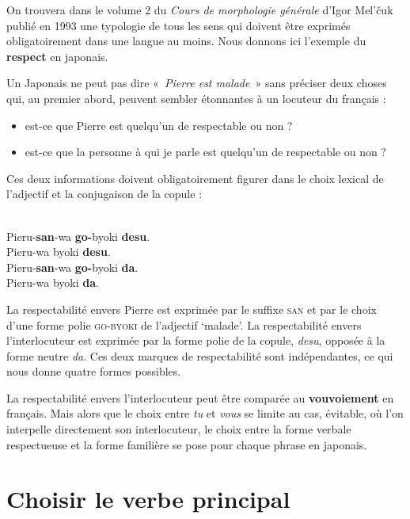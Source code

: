 {    On trouvera dans le volume 2 du \textit{Cours de morphologie générale} d’Igor Mel’čuk publié en 1993 une typologie de tous les sens qui doivent être exprimés obligatoirement dans une langue au moins. Nous donnons ici l’exemple du \textbf{respect} en japonais.

    Un Japonais ne peut pas dire «~\textit{Pierre est malade~}» sans préciser deux choses qui, au premier abord, peuvent sembler étonnantes à un locuteur du français :

    \begin{itemize}
    \item  est-ce que Pierre est quelqu’un de respectable ou non ?
    \item  est-ce que la personne à qui je parle est quelqu’un de respectable ou non ?
    \end{itemize}

    Ces deux informations doivent obligatoirement figurer dans le choix lexical de l’adjectif et la conjugaison de la copule :

    \ea
    \\Pieru-\textbf{san}{}-wa \textbf{go-}byoki \textbf{desu}.
    \\Pieru-wa byoki \textbf{desu}.
    \\Pieru-\textbf{san}{}-wa \textbf{go-}byoki \textbf{da}.
    \\Pieru-wa byoki \textbf{da}.
    \z
    \z

    La respectabilité envers Pierre est exprimée par le suffixe \textsc{san} et par le choix d’une forme polie \textsc{go-byoki} de l’adjectif ‘malade’. La respectabilité envers l’interlocuteur est exprimée par la forme polie de la copule, \textit{desu}, opposée à la forme neutre \textit{da}. Ces deux marques de respectabilité sont indépendantes, ce qui nous donne quatre formes possibles.

    La respectabilité envers l’interlocuteur peut être comparée au \textbf{vouvoiement} en français. Mais alors que le choix entre \textit{tu} et \textit{vous} se limite au cas, évitable, où l’on interpelle directement son interlocuteur, le choix entre la forme verbale respectueuse et la forme familière se pose pour chaque phrase en japonais.
}
\section{Choisir le verbe principal}\label{sec:1.2.13}

